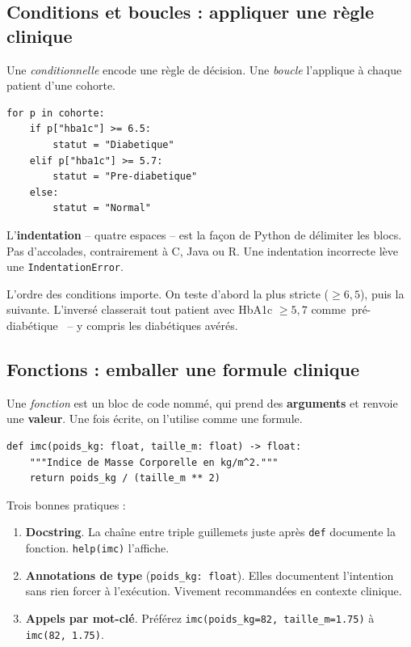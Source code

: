 \documentclass[11pt,a4paper]{article}
\providecommand{\og}{\guillemotleft\,}
\providecommand{\fg}{\,\guillemotright}
\begin{document}
\subsection{Conditions et boucles : appliquer une r\`egle clinique}

Une \emph{conditionnelle} encode une r\`egle de d\'ecision. Une
\emph{boucle} l'applique \`a chaque patient d'une cohorte.

\begin{verbatim}
for p in cohorte:
    if p["hba1c"] >= 6.5:
        statut = "Diabetique"
    elif p["hba1c"] >= 5.7:
        statut = "Pre-diabetique"
    else:
        statut = "Normal"
\end{verbatim}

L'\textbf{indentation} -- quatre espaces -- est la fa\c{c}on de Python de
d\'elimiter les blocs. Pas d'accolades, contrairement \`a C, Java ou R.
Une indentation incorrecte l\`eve une \texttt{IndentationError}.

L'ordre des conditions importe. On teste d'abord la plus stricte
($\geq 6{,}5$), puis la suivante. L'invers\'e classerait tout patient
avec HbA1c $\geq 5{,}7$ comme \og pr\'e-diab\'etique \fg{} -- y compris
les diab\'etiques av\'er\'es.

\subsection{Fonctions : emballer une formule clinique}

Une \emph{fonction} est un bloc de code nomm\'e, qui prend des
\textbf{arguments} et renvoie une \textbf{valeur}. Une fois \'ecrite,
on l'utilise comme une formule.

\begin{verbatim}
def imc(poids_kg: float, taille_m: float) -> float:
    """Indice de Masse Corporelle en kg/m^2."""
    return poids_kg / (taille_m ** 2)
\end{verbatim}

Trois bonnes pratiques :

\begin{enumerate}
  \item \textbf{Docstring}. La cha\^ine entre triple guillemets juste
        apr\`es \texttt{def} documente la fonction. \texttt{help(imc)}
        l'affiche.
  \item \textbf{Annotations de type}
        (\texttt{poids\_kg: float}). Elles documentent l'intention
        sans rien forcer \`a l'ex\'ecution. Vivement recommand\'ees en
        contexte clinique.
  \item \textbf{Appels par mot-cl\'e}. Pr\'ef\'erez
        \texttt{imc(poids\_kg=82, taille\_m=1{.}75)} \`a
        \texttt{imc(82, 1{.}75)}.
\end{enumerate}
\end{document}
